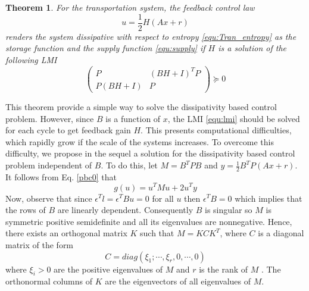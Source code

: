 \documentclass[trsc,nonblindrev]{informs3} %
\renewcommand{\vec}[1]{#1}
\newcommand{\mat}[1]{#1}
\newtheorem{thm}{Theorem}
\begin{document}
\begin{thm}\label{thm:pbc}
For the transportation system, the feedback control law
\begin{equation}
\label{equ:feedback}
\vec{u}=\frac{1}{2}\mat{H}(\mat{A}\vec{x}+\vec{r})
\end{equation}
renders the system dissipative with respect to
entropy \eqref{equ:Tran_entropy} as the storage function and the
supply function \eqref{equ:supply} if $\mat{H}$ is a solution of the
following LMI
\begin{equation}\label{equ:lmi}
\begin{pmatrix}
\mat{P}& (\mat{B}\mat{H}+\mat{I})^T \mat{P} \\
\mat{P} (\mat{B}\mat{H}+\mat{I})  & \mat{P}
\end{pmatrix}\succeq 0
\end{equation}
\end{thm}
This theorem provide a simple way to solve the dissipativity based control problem.
However, since $\mat{B}$ is a function of $\vec{x}$, the LMI \eqref{equ:lmi} should be solved for each cycle to get feedback gain $\mat{H}$. This presents  computational difficulties, which rapidly grow if the scale of the systems increases. To overcome this difficulty, we propose in the sequel a solution for the dissipativity based control problem independent of $B$. To do this, 
let
$\mat{M}=\mat{B}^T\mat{P}\mat{B}$ and
$\vec{y}=\frac{1}{2}\mat{B}^T\mat{P}(\mat{A}\vec{x}+\vec{r})$.  It
follows from Eq. \eqref{pbc0} that
\begin{equation}\label{pbcc}
g(\vec{u})=\vec{u}^T\mat{M}\vec{u}+2\vec{u}^T\vec{y}
\end{equation}
Now, observe that  since $\epsilon^T\vec{l} =\epsilon^T\mat{B}\vec{u}=0$ for all $u$ then $\epsilon^T\mat{B}=0$ which implies that the rows of $B$ are linearly dependent. Consequently  $B$ is singular so  $M$ is symmetric positive semidefinite and  all its eigenvalues  are nonnegative.  Hence, there exists an orthogonal matrix $K$ such that $M=KCK^T $, where $C$ is a diagonal matrix of the form
$$C=diag(\xi_1;\cdots,\xi_r,0,\cdots,0)$$
where $\xi_i>0$  are the positive eigenvalues  of $M$  and $r$ is the rank of $M$ . The orthonormal columns of $K$  are the eigenvectors of all eigenvalues  of $M$. 
\end{document}
